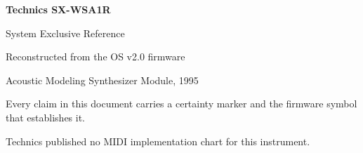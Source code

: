 


\begin{titlepage}
\centering
\vspace*{3cm}
{\Huge\bfseries Technics SX-WSA1R\par}
\vspace{6mm}
{\LARGE System Exclusive Reference\par}
\vspace{18mm}
{\large Reconstructed from the OS v2.0 firmware\par}
\vspace{4mm}
{\large Acoustic Modeling Synthesizer Module, 1995\par}
\vfill
{\small Every claim in this document carries a certainty marker and the firmware
symbol that establishes it.\par}
\vspace{4mm}
{\small Technics published no MIDI implementation chart for this instrument.\par}
\end{titlepage}

\tableofcontents








\appendix




